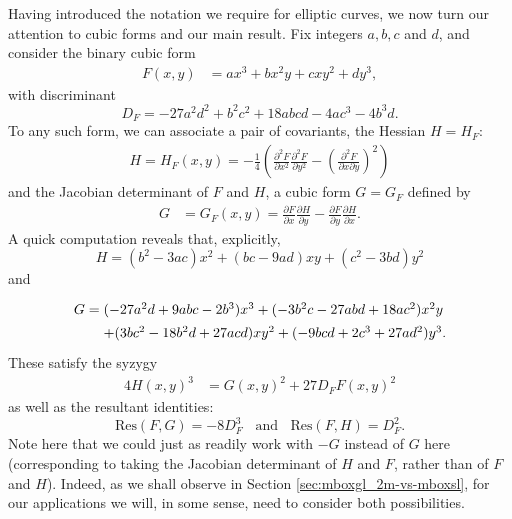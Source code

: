 \documentclass[11pt]{report}
\theoremstyle{definition}
\begin{document}
Having introduced the notation we require for elliptic curves, we now turn our attention to cubic forms and our main result. Fix integers $a, b,
c$ and $d$, and consider the binary cubic form
\begin{align} \label{form0}
F(x,y)&=ax^3+bx^2y+cxy^2+dy^3,
\end{align}
with discriminant
\begin{equation} \label{claire-bear}
D_F = -27 a^2 d^2 + b^2 c^2 + 18 abcd -4 ac^3 -4 b^3 d.
\end{equation}
To any such form, we can associate a pair of covariants, the Hessian  $H=H_F$:
\begin{align*}
H=  H_F (x,y)=  - \frac{1}{4} \left(\frac{\partial^2 F}{\partial x^2} \frac{\partial^2 F}{\partial y^2} -
\left(\frac{\partial^2 F}{\partial x \partial y}\right)^2 \right)
\end{align*}
and the Jacobian determinant of $F$ and $H$,  a cubic form $G=G_F$ defined by
\begin{align*}
G&=G_F (x,y)=\frac{\partial F}{\partial x}\frac{\partial H}{\partial y}-  \frac{\partial F}{\partial y} \frac{\partial
H}{\partial x}.
\end{align*}
A quick computation reveals that, explicitly,
$$
H= (b^2-3ac) x^2 + (bc-9ad) xy + (c^2-3bd) y^2
$$
and
$$
\arraycolsep=1.4pt\def\arraystretch{1.4}
\begin{array}{ll}
G = & (-27 a^2d+9abc-2b^3)  x^3 + (-3b^2c-27 abd+18ac^2) x^2 y \\
   & + (3bc^2-18b^2d+27acd)  x y^2 + (-9bcd+2c^3+27ad^2) y^3.\\
\end{array}
$$
These satisfy the syzygy
\begin{align} \label{syz}
4H(x,y)^3 &= G(x,y)^2+27D_F F(x,y)^2
\end{align}
as well as the resultant identities:
\begin{equation} \label{resultant}
\mbox{Res} (F,G) = -8 D_F^3 \; \; \mbox{ and } \; \;
 \mbox{Res} (F,H) = D_F^2.
\end{equation}
Note here that we could just as readily work with $-G$ instead of $G$ here (corresponding to taking the Jacobian determinant of $H$ and $F$, rather than of $F$ and $H$). Indeed, as we shall observe in Section \ref{sec:mboxgl_2m-vs-mboxsl}, for our applications we will, in some sense, need to consider both possibilities.
\end{document}
